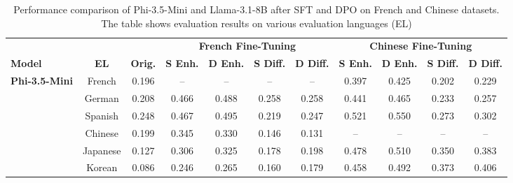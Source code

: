 
\begin{table}[t]
  \centering
  \small
  \renewcommand{\arraystretch}{1}
  \setlength{\tabcolsep}{7pt}
  \caption{Performance comparison of Phi-3.5-Mini and Llama-3.1-8B after SFT and DPO on French and Chinese datasets. The table shows evaluation results on various evaluation languages (EL)}
  \label{tab:ft_one_dpo}
  \begin{tabular}{lcccccccccc}
    \toprule
    & & & \multicolumn{4}{c}{\textbf{French Fine-Tuning}} & \multicolumn{4}{c}{\textbf{Chinese Fine-Tuning}} \\
    \cmidrule(lr){4-7} \cmidrule(lr){8-11}
    \multirow{-2}{*}{\textbf{Model}} & \multirow{-2}{*}{\textbf{EL}} & \multirow{-2}{*}{\textbf{Orig.}} & \textbf{S Enh.} & \textbf{D Enh.} & \textbf{S Diff.} & \textbf{D Diff.} & \textbf{S Enh.} & \textbf{D Enh.} & \textbf{S Diff.} & \textbf{D Diff.} \\
    \midrule
    \multirow[c]{6}{*}{\textbf{Phi-3.5-Mini}} & French   & 0.196     & --    & --    & -- & -- & 0.397 & 0.425 &   0.202  & 0.229 \\
     & German   & 0.208          & 0.466 &  0.488 & 0.258 & 0.258 & 0.441 & 0.465&  0.233  & 0.257 \\
     & Spanish  & 0.248         & 0.467 & 0.495 & 0.219 & 0.247 & 0.521 & 0.550 & 0.273 & 0.302  \\
     & \cellcolor{lightblue}Chinese & \cellcolor{lightblue}0.199 & \cellcolor{lightblue}0.345 & \cellcolor{lightblue}0.330 & \cellcolor{lightblue}0.146 & \cellcolor{lightblue}0.131  & \cellcolor{lightblue}--    & \cellcolor{lightblue}--    & \cellcolor{lightblue}--   & \cellcolor{lightblue}--  \\
     & \cellcolor{lightblue}Japanese& \cellcolor{lightblue}0.127 & \cellcolor{lightblue}0.306 & \cellcolor{lightblue}0.325 & \cellcolor{lightblue}0.178 & \cellcolor{lightblue}0.198 & \cellcolor{lightblue}0.478 & \cellcolor{lightblue}0.510 &  \cellcolor{lightblue}0.350 &  \cellcolor{lightblue}0.383  \\
     & \cellcolor{lightblue}Korean  & \cellcolor{lightblue}0.086   & \cellcolor{lightblue}0.246 &  \cellcolor{lightblue}0.265 & \cellcolor{lightblue}0.160 & \cellcolor{lightblue}0.179 & \cellcolor{lightblue}0.458 & \cellcolor{lightblue}0.492 &  \cellcolor{lightblue}0.373  & \cellcolor{lightblue}0.406 \\

\end{tabular}
\end{table}
